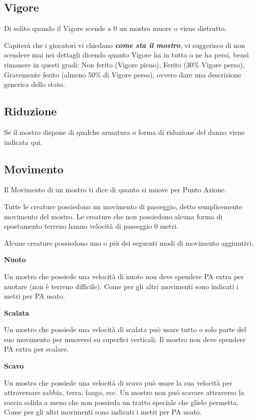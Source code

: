 \documentclass[12pt,a4paper,twoside,openany]{book}
\begin{document}
\begin{multicols}{2}
\subsection{Vigore}

Di solito quando il Vigore scende a 0 un mostro muore o viene distrutto.

Capiterà che i giocatori vi chiedano \textbf{\textit{come sta il mostro}}, vi suggerisco di non scendere mai nei dettagli dicendo quanto Vigore ha in tutto o ne ha persi, bensì rimanere in questi gradi:  Non ferito (Vigore pieno), Ferito (30\% Vigore perso), Gravemente ferito (almeno 50\% di Vigore perso), ovvero dare una descrizione generica dello stato. 

\subsection{Riduzione}

Se il mostro dispone di qualche armatura o forma di riduzione del danno viene indicata qui.

\subsection{Movimento}

Il Movimento di un mostro ti dice di quanto si muove per Punto Azione.

Tutte le creature possiedono un movimento di passeggio, detto semplicemente movimento del mostro. Le creature che non possiedono alcuna forma di spostamento terreno hanno velocità di passeggio 0 metri.

Alcune creature possiedono uno o più dei seguenti modi di movimento aggiuntivi.

\smallskip\textbf{Nuoto}

Un mostro che possiede una velocità di nuoto non deve spendere PA extra per nuotare (non è terreno difficile). Come per gli altri movimenti sono indicati i metri per PA usato.

\smallskip\textbf{Scalata}

Un mostro che possiede una velocità di scalata può usare tutto o solo parte del suo movimento per muoversi su superfici verticali. Il mostro non deve spendere PA extra per scalare.

\smallskip\textbf{Scavo}

Un mostro che possiede una velocità di scavo può usare la sua velocità per attraversare sabbia, terra, fango, ecc. Un mostro non può scavare attraverso la roccia solida a meno che non possieda un tratto speciale che glielo permetta. Come per gli altri movimenti sono indicati i metri per PA usato.


\end{multicols}
\end{document}
